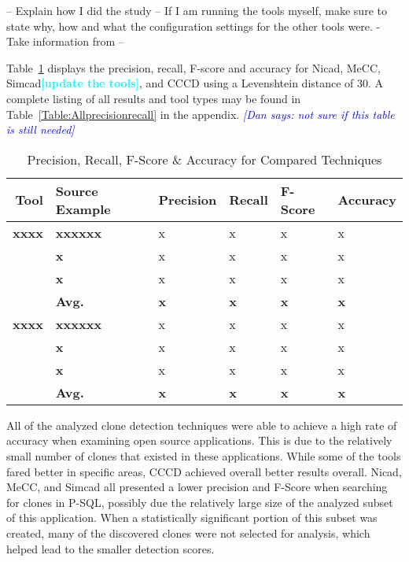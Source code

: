 \documentclass[smallextended]{svjour3}       %
\newcommand{\todo}[1]{\textcolor{cyan}{\textbf{[#1]}}}
\newcommand{\dan}[1]{\textcolor{blue}{{\it [Dan says: #1]}}}
\begin{document}
-- Explain how I did the study
-- If I am running the tools myself, make sure to state why, how and what the configuration settings for the other tools were. - Take information from  \cite{Wang:2013:SBC:2491411.2491420}
--




Table~\ref{Table:precisionrecall} displays the precision, recall, F-score and accuracy for Nicad, MeCC, Simcad\todo{update the tools}, and CCCD using a Levenshtein distance of 30. A complete listing of all results and tool types may be found in Table~\ref{Table:Allprecisionrecall} in the appendix. \dan{not sure if this table is still needed}
\begin{table}[thb!]

\begin{center}
\caption{Precision, Recall, F-Score \& Accuracy for Compared Techniques}
\label{Table:precisionrecall}
\begin{tabular}{r||l|l|l|l|l}
\bfseries Tool & \bfseries Source Example & \bfseries Precision & \bfseries Recall & \bfseries F-Score & \bfseries Accuracy \\ \hline\hline
  \bfseries xxxx & \bfseries xxxxxx & x & x & x & x   \\ \cline{2-6}
& \bfseries x & x & x & x & x \\ \cline{2-6}
& \bfseries x & x & x & x & x \\ \cline{2-6}
& \bfseries Avg. & \bfseries x & \bfseries x & \bfseries x & \bfseries x \\ \cline{2-6}
 \hline \hline

  \bfseries xxxx & \bfseries xxxxxx & x & x & x & x   \\ \cline{2-6}
& \bfseries x & x & x & x & x \\ \cline{2-6}
& \bfseries x & x & x & x & x \\ \cline{2-6}
& \bfseries Avg. & \bfseries x & \bfseries x & \bfseries x & \bfseries x \\ \cline{2-6}
 \hline
\end{tabular}
\end{center}
\end{table}


All of the analyzed clone detection techniques were able to achieve a high rate of accuracy when examining open source applications. This is due to the relatively small number of clones that existed in these applications. While some of the tools fared better in specific areas, CCCD achieved overall better results overall. Nicad, MeCC, and Simcad all presented a lower precision and F-Score when searching for clones in P-SQL, possibly due the relatively large size of the analyzed subset of this application. When a statistically significant portion of this subset was created, many of the discovered clones were not selected for analysis, which helped lead to the smaller detection scores.
\end{document}
